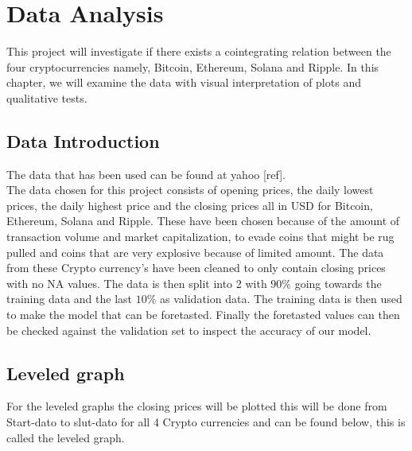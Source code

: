 \chapter{Data Analysis}
This project will investigate if there exists a cointegrating relation between the four cryptocurrencies namely, Bitcoin, Ethereum, Solana and Ripple. In this chapter, we will examine the data with visual interpretation of plots and qualitative tests.

\section{Data Introduction}
The data that has been used can be found at yahoo  [ref].\\
The data chosen for this project consists of opening prices, the daily lowest prices, the daily highest price and the closing prices all in USD for Bitcoin, Ethereum, Solana and Ripple. These have been chosen because of the amount of transaction volume and market capitalization, to evade coins that might be rug pulled and coins that are very explosive because of limited amount. The data from these Crypto currency's have been cleaned to only contain closing prices with no NA values. The data is then split into 2 with $90\%$ going towards the training data and the last $10\%$ as validation data. The training data is then used to make the model that can be foretasted. Finally the foretasted values can then be checked against the validation set to inspect the accuracy of our model. 
\newpage
\section{Leveled graph}
For the leveled graphs the closing prices will be plotted this will be done from Start-dato to slut-dato for all 4 Crypto currencies and can be found below, this is called the leveled graph.

